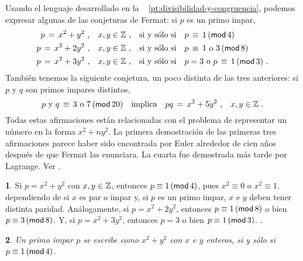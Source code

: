 \theoremstyle{plain}
\newtheorem{teoFermat}{\teoname}[section]
\newtheorem{lemaFermat}[teoFermat]{\lemaname}

\theoremstyle{definition}
\newtheorem{obsFermat}[teoFermat]{\obsname}
\newtheorem{ejemFermat}[teoFermat]{\ejemname}


Usando el lenguaje desarrollado en la \partname~%
\ref{pt:divisibilidad-y-congruencia}, podemos expresar algunas de las
conjeturas de Fermat: si $p$ es un primo impar,
\begin{displaymath}
	\begin{aligned}
		p\,=\,x^2+y^2\text{ ,}\quad x,y\in\Enteros\text{ ,}
			& \quad\text{si y s\'olo si}\quad
			p\,\equiv\,1\tmodulo[4] \\
		p\,=\,x^2+2y^2\text{ ,}\quad x,y\in\Enteros\text{ ,}
			& \quad\text{si y s\'olo si}\quad
			p\,\equiv\,1\text{ o }3\tmodulo[8] \\
		p\,=\,x^2+3y^2\text{ ,}\quad x,y\in\Enteros\text{ ,}
			& \quad\text{si y s\'olo si}\quad
			p=3\text{ o }p\,\equiv\,1\tmodulo[3]
		\text{ .}
	\end{aligned}
\end{displaymath}
%
Tambi\'en tenemos la siguiente conjetura, un poco distinta de las tres
anteriores: si $p$ y $q$ son primos impares distintos,
\begin{displaymath}
	p\text{ y }q\,\equiv\,3\text{ o }7\tmodulo[20]
		\quad\text{implica}\quad
		pq\,=\,x^2+5y^2\text{ ,}\quad x,y\in\Enteros
	\text{ .}
\end{displaymath}
%
Todas estas afirmaciones est\'an relacionadas con el problema de representar
un n\'umero en la forma $x^2+ny^2$. La primera demostraci\'on de las primeras
tres afirmaciones parece haber sido encontrada por Euler alrededor de cien
a\~nos despu\'es de que Fermat las enunciara. La cuarta fue demostrada m\'as
tarde por Lagrange. Ver \cite[pp.~7--9]{Cox}.

\begin{ejemFermat}\label{ejem:fermat}
	Si $p=x^2+y^2$ con $x,y\in\Enteros$, entonces $p\equiv 1\tmodulo[4]$,
	pues $x^2\equiv 0$ o $x^2\equiv 1$, dependiendo de si $x$ es par o
	impar y, si $p$ es un primo impar, $x$ e $y$ deben tener distinta
	paridad.
	An\'alogamente, si $p=x^2+2y^2$, entonces $p\equiv 1\tmodulo[8]$ o
	bien $p\equiv 3\tmodulo[8]$. Y, si $p=x^2+3y^2$, entonces
	$p=3$ o bien $p\equiv 1\tmodulo[3]$. \quedacomoejercicio.
\end{ejemFermat}

\begin{teoFermat}\label{teo:fermat}
	Un primo impar $p$ se escribe como $x^2+y^2$ con $x$ e $y$ enteros,
	si y s\'olo si $p\equiv 1\tmodulo[4]$.
\end{teoFermat}

